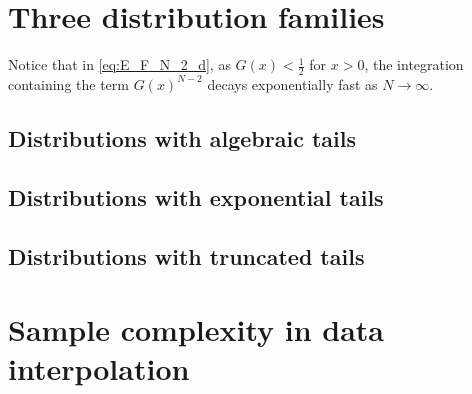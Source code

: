 \documentclass{aptpub}
\begin{document}
\section{Three distribution families}\label{sec:three_distriutions}
Notice that in \eqref{eq:E_F_N_2_d}, as $G(x)<\frac{1}{2}$ for $x>0$, the integration containing the
term $G(x)^{N-2}$ decays exponentially fast as $N\to \infty$.
\subsection{Distributions with algebraic tails}
\subsection{Distributions with exponential tails}
\subsection{Distributions with truncated tails}
\section{Sample complexity in data interpolation}\label{sec:sample_complexity}




\appendix
\end{document}
